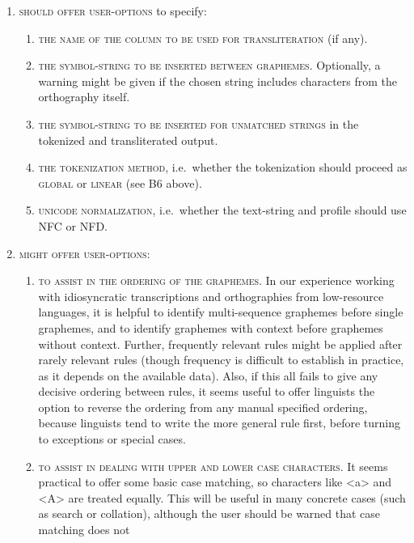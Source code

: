 \begin{enumerate}
	\def\labelenumi{\arabic{enumi}.} 
	\item \textsc{should offer user-options} to specify:
	\begin{enumerate}
		\def\labelenumii{C\arabic{enumii}.} 
		\item \textsc{the name of the column to be used for transliteration} (if any). 
		\item \textsc{the symbol-string to be inserted between graphemes.} Optionally,
        a warning might be given if the chosen string includes characters from
        the orthography itself. 
		\item \textsc{the symbol-string to be inserted for unmatched strings} in the
        tokenized and transliterated output. 
		\item \textsc{the tokenization method}, i.e.~whether the tokenization should
        proceed as \textsc{global} or \textsc{linear} (see B6 above). 
		\item \textsc{unicode normalization}, i.e.~whether the text-string and profile
        should use \textsc{NFC} or \textsc{NFD}. 
    \end{enumerate}
	\item \textsc{might offer user-options}:
	\begin{enumerate}
		\def\labelenumii{C\arabic{enumii}.} \setcounter{enumii}{5} 
		\item \textsc{to assist in the ordering of the graphemes.} In our experience 
		working with idiosyncratic transcriptions and orthographies from low-resource languages, it
        is helpful to identify multi-sequence graphemes before single graphemes, and to
        identify graphemes with context before graphemes without context. Further,
        frequently relevant rules might be applied after rarely relevant rules
        (though frequency is difficult to establish in practice, as it depends
        on the available data). Also, if this all fails to give any decisive
        ordering between rules, it seems useful to offer linguists the option to
        reverse the ordering from any manual specified ordering, because
        linguists tend to write the more general rule first, before turning to
        exceptions or special cases. 
		\item \textsc{to assist in dealing with upper and lower case characters.} It
        seems practical to offer some basic case matching, so characters like
        <a> and <A> are treated equally. This will be useful in many concrete
        cases (such as search or collation), although the user should be warned that case matching does not

\end{enumerate}
\end{enumerate}
